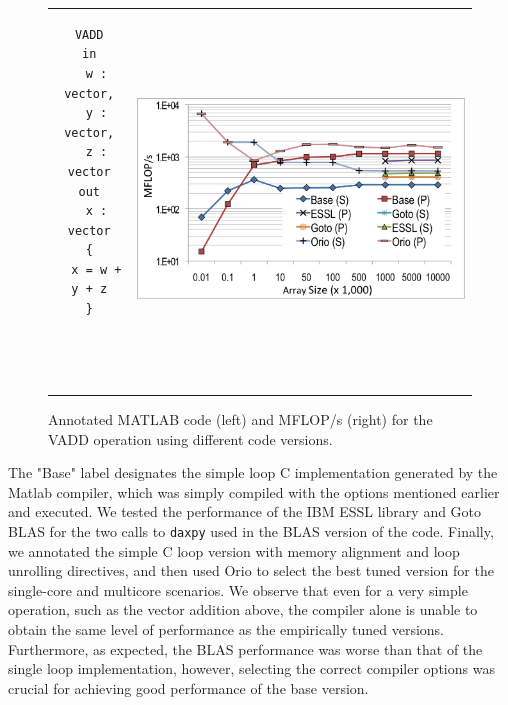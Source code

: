 \documentclass[runningheads]{llncs}
\begin{document}
\begin{figure}[htp]
\centering
\begin{tabular}{cc}
\begin{minipage}[b]{.25\textwidth}
\footnotesize
\begin{verbatim}
VADD
in
  w : vector,
  y : vector,
  z : vector
out
  x : vector
{
  x = w + y + z
}




\end{verbatim}
\end{minipage}
&
\begin{minipage}[b]{.6\textwidth}
\includegraphics[width=\textwidth]{figures/vadd_bgp.png}
\end{minipage}\\
\end{tabular}
\caption{Annotated MATLAB code (left) and MFLOP/s (right) for the VADD operation using different code versions.}
\label{fig:vadd}
\end{figure}

The "Base" label designates the simple loop C implementation generated by the Matlab compiler, which was simply compiled with the options mentioned earlier and executed. We tested the performance of the IBM ESSL library and Goto BLAS for the two calls to \texttt{daxpy} used in the BLAS version of the code. Finally, we annotated the simple C loop version with memory alignment and loop unrolling directives, and then used Orio to select the best tuned version for the single-core and multicore scenarios. We observe that even for a very simple operation, such as the vector addition above, the compiler alone is unable to obtain the same level of performance as the empirically tuned versions. Furthermore, as expected, the BLAS performance was worse than that of the single loop implementation, however, selecting the correct compiler options was crucial for achieving good performance of the base version.
\end{document}
